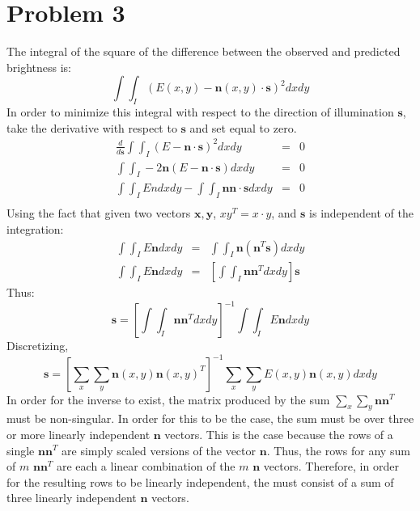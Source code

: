 \documentclass[letter,11pt]{article}
\begin{document}
{\section*{Problem 3}
The integral of the square of the difference between the observed and predicted brightness is:
\begin{equation*}
	\int\int_I \left( E(x,y) - \mathbf{n}(x,y)\cdot\mathbf{s}\right)^2 dxdy
\end{equation*}
In order to minimize this integral with respect to the direction of illumination $\mathbf{s}$, take
the derivative with respect to $\mathbf{s}$ and set equal to zero.
\begin{eqnarray*}
	\frac{d}{d\mathbf{s}}\int\int_I \left( E - \mathbf{n}\cdot\mathbf{s}\right)^2 dxdy &=& 0\\
	\int\int_I -2\mathbf{n}\left( E - \mathbf{n}\cdot\mathbf{s}\right) dxdy &=& 0\\
	\int\int_I E{n}dxdy - \int\int_I\mathbf{n}\mathbf{n}\cdot\mathbf{s}dxdy &=& 0\\
\end{eqnarray*}
Using the fact that given two vectors $\mathbf{x},\mathbf{y}$, $xy^T=x\cdot y$, and $\mathbf{s}$ 
is independent of the integration:
\begin{eqnarray*}
	\int\int_I E\mathbf{n}dxdy &=& \int\int_I \mathbf{n}(\mathbf{n}^T\mathbf{s}) dxdy \\
	\int\int_I E\mathbf{n}dxdy &=& \left[\int\int_I \mathbf{n}\mathbf{n}^T dxdy\right]\mathbf{s}
\end{eqnarray*}
Thus:
\begin{equation*}
	\mathbf{s} = \left[\int\int_I \mathbf{n}\mathbf{n}^T dxdy\right]^{-1}\int\int_I E\mathbf{n}dxdy
\end{equation*}
Discretizing,
\begin{equation*}
	\mathbf{s} = \left[\sum_x\sum_y \mathbf{n}(x,y)\mathbf{n}(x,y)^T \right]^{-1}\sum_x\sum_y E(x,y)\mathbf{n}(x,y)dxdy
\end{equation*}
In order for the inverse to exist, the matrix produced by the sum $\sum_x\sum_y \mathbf{n}\mathbf{n}^T$ must be non-singular.  In order for this to be the case, the sum must be
over three or more linearly independent $\mathbf{n}$ vectors.  This is the case because the rows of a single $\mathbf{n}\mathbf{n}^T$ are simply scaled versions of the vector $\mathbf{n}$.  Thus, the rows for any sum of $m$ $\mathbf{n}\mathbf{n}^T$ are each a linear combination of the $m$ $\mathbf{n}$ vectors.  Therefore, in order for the resulting rows to be linearly independent, the must consist of a sum of three linearly independent $\mathbf{n}$ vectors.

}
\end{document}
